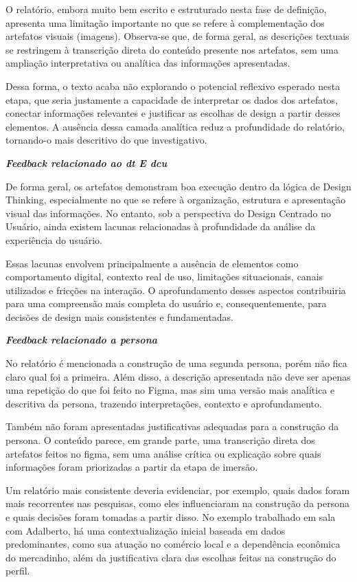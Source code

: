 \documentclass[
  sigconf,
  nonacm, %
  language=portuguese
]{acmart}
\begin{document}
O relatório, embora muito bem escrito e estruturado nesta fase de definição, apresenta uma limitação importante no que se refere à complementação dos artefatos visuais (imagens). Observa-se que, de forma geral, as descrições textuais se restringem à transcrição direta do conteúdo presente nos artefatos, sem uma ampliação interpretativa ou analítica das informações apresentadas.

Dessa forma, o texto acaba não explorando o potencial reflexivo esperado nesta etapa, que seria justamente a capacidade de interpretar os dados dos artefatos, conectar informações relevantes e justificar as escolhas de design a partir desses elementos. A ausência dessa camada analítica reduz a profundidade do relatório, tornando-o mais descritivo do que investigativo.

\textit{\textbf{Feedback relacionado ao dt E dcu}}

De forma geral, os artefatos demonstram boa execução dentro da lógica de Design Thinking, especialmente no que se refere à organização, estrutura e apresentação visual das informações. No entanto, sob a perspectiva do Design Centrado no Usuário, ainda existem lacunas relacionadas à profundidade da análise da experiência do usuário.

Essas lacunas envolvem principalmente a ausência de elementos como comportamento digital, contexto real de uso, limitações situacionais, canais utilizados e fricções na interação. O aprofundamento desses aspectos contribuiria para uma compreensão mais completa do usuário e, consequentemente, para decisões de design mais consistentes e fundamentadas.

\textit{\textbf{Feedback relacionado a persona}}

No relatório é mencionada a construção de uma segunda persona, porém não fica claro qual foi a primeira. Além disso, a descrição apresentada não deve ser apenas uma repetição do que foi feito no Figma, mas sim uma versão mais analítica e descritiva da persona, trazendo interpretações, contexto e aprofundamento.

Também não foram apresentadas justificativas adequadas para a construção da persona. O conteúdo parece, em grande parte, uma transcrição direta dos artefatos feitos no figma, sem uma análise crítica ou explicação sobre quais informações foram priorizadas a partir da etapa de imersão.

Um relatório mais consistente deveria evidenciar, por exemplo, quais dados foram mais recorrentes nas pesquisas, como eles influenciaram na construção da persona e quais decisões foram tomadas a partir disso. No exemplo trabalhado em sala com Adalberto, há uma contextualização inicial baseada em dados predominantes, como sua atuação no comércio local e a dependência econômica do mercadinho, além da justificativa clara das escolhas feitas na construção do perfil.
\end{document}
